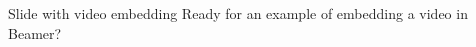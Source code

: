 \documentclass[aspectratio=169,10pt]{beamer}
\author{\getStudentName}
\title{\getProjName}
\date{October 10, 2023}
\begin{document}
	















\begin{frame}{Slide with video embedding}
	Ready for an example of embedding a video in Beamer?
	\pause
	\begin{center}
	\end{center}
\end{frame}

%
%

\end{document}
